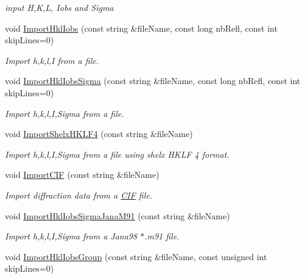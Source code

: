 \begin{DoxyCompactItemize}
\begin{DoxyCompactList}\small\item\em input H,K,L, Iobs and Sigma \end{DoxyCompactList}\item 
void \mbox{\hyperlink{class_obj_cryst_1_1_diffraction_data_single_crystal_ac306439389c8eab225dd8dd87aa8f189}{Import\+Hkl\+Iobs}} (const string \&file\+Name, const long nb\+Refl, const int skip\+Lines=0)
\begin{DoxyCompactList}\small\item\em Import h,k,l,I from a file. \end{DoxyCompactList}\item 
void \mbox{\hyperlink{class_obj_cryst_1_1_diffraction_data_single_crystal_a041f22715b9b4d1f2beb2b7e387fa682}{Import\+Hkl\+Iobs\+Sigma}} (const string \&file\+Name, const long nb\+Refl, const int skip\+Lines=0)
\begin{DoxyCompactList}\small\item\em Import h,k,l,I,Sigma from a file. \end{DoxyCompactList}\item 
void \mbox{\hyperlink{class_obj_cryst_1_1_diffraction_data_single_crystal_a7cb0c6ef5e877e582baf5eb8133e2199}{Import\+Shelx\+H\+K\+L\+F4}} (const string \&file\+Name)
\begin{DoxyCompactList}\small\item\em Import h,k,l,I,Sigma from a file using shelx H\+K\+LF 4 format. \end{DoxyCompactList}\item 
void \mbox{\hyperlink{class_obj_cryst_1_1_diffraction_data_single_crystal_ad3528e9815e774d0a442fe231434ed05}{Import\+C\+IF}} (const string \&file\+Name)
\begin{DoxyCompactList}\small\item\em Import diffraction data from a \mbox{\hyperlink{class_obj_cryst_1_1_c_i_f}{C\+IF}} file. \end{DoxyCompactList}\item 
void \mbox{\hyperlink{class_obj_cryst_1_1_diffraction_data_single_crystal_a5721769a1b4a8e33664c3b0867c05086}{Import\+Hkl\+Iobs\+Sigma\+Jana\+M91}} (const string \&file\+Name)
\begin{DoxyCompactList}\small\item\em Import h,k,l,I,Sigma from a Jana98 \textquotesingle{}$\ast$.m91\textquotesingle{} file. \end{DoxyCompactList}\item 
void \mbox{\hyperlink{class_obj_cryst_1_1_diffraction_data_single_crystal_af590310eb70814be523947dc7ddc695c}{Import\+Hkl\+Iobs\+Group}} (const string \&file\+Name, const unsigned int skip\+Lines=0)

\end{DoxyCompactItemize}
